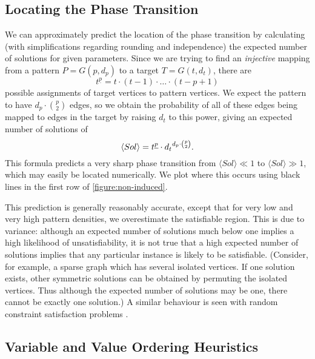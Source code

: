 \documentclass[twoside,11pt]{article}
\newcommand{\citep}[1]{\cite{#1}}
\begin{document}
\subsection{Locating the Phase Transition}

We can approximately predict the location of the phase transition by calculating (with
simplifications regarding rounding and independence) the expected number of solutions for given
parameters. Since we are trying to find an \emph{injective} mapping from a pattern $P = G(p, d_p)$
to a target $T = G(t, d_t)$, there are \[ t^{\underline{p}} = t \cdot (t - 1) \cdot \ldots \cdot (t -
p + 1) \] possible assignments of target vertices to pattern vertices.  We expect the pattern to have
$d_p \cdot \binom{p}{2}$ edges, so we obtain the probability of all of these edges being mapped to
edges in the target by raising $d_t$ to this power, giving an expected number of solutions of \[
\langle Sol \rangle = t^{\underline{p}} \cdot {d_t}^{d_p \cdot \binom{p}{2}} \textnormal{.} \] This
formula predicts a very sharp phase transition from $\langle Sol \rangle \ll 1$ to $\langle Sol
\rangle \gg 1$, which may easily be located numerically. We plot where this occurs using black lines
in the first row of \cref{figure:non-induced}.

This prediction is generally reasonably accurate, except that for very low and very high pattern
densities, we overestimate the satisfiable region. This is due to variance: although an expected
number of solutions much below one implies a high likelihood of unsatisfiability, it is not true
that a high expected number of solutions implies that any particular instance is likely to be
satisfiable. (Consider, for example, a sparse graph which has several isolated vertices. If one
solution exists, other symmetric solutions can be obtained by permuting the isolated vertices.
Thus although the expected number of solutions may be one, there cannot be exactly one solution.) A
similar behaviour is seen with random constraint satisfaction problems
\citep{Smith:1996}.

\subsection{Variable and Value Ordering Heuristics}
\end{document}
